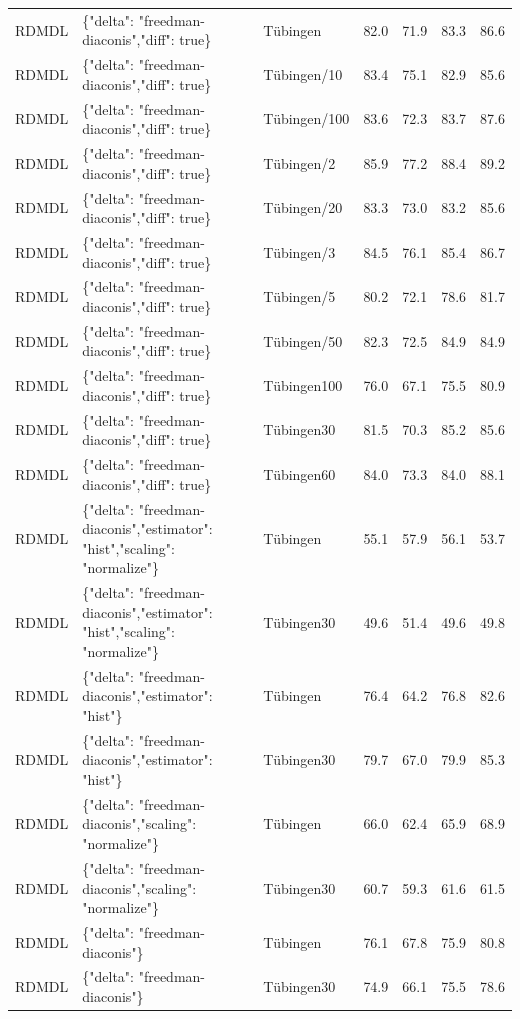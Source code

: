 \begin{tabular}{lllllll}
RDMDL & \{"delta": "freedman-diaconis","diff": true\} & Tübingen & 82.0 & 71.9 & 83.3 & 86.6 \\
RDMDL & \{"delta": "freedman-diaconis","diff": true\} & Tübingen/10 & 83.4 & 75.1 & 82.9 & 85.6 \\
RDMDL & \{"delta": "freedman-diaconis","diff": true\} & Tübingen/100 & 83.6 & 72.3 & 83.7 & 87.6 \\
RDMDL & \{"delta": "freedman-diaconis","diff": true\} & Tübingen/2 & 85.9 & 77.2 & 88.4 & 89.2 \\
RDMDL & \{"delta": "freedman-diaconis","diff": true\} & Tübingen/20 & 83.3 & 73.0 & 83.2 & 85.6 \\
RDMDL & \{"delta": "freedman-diaconis","diff": true\} & Tübingen/3 & 84.5 & 76.1 & 85.4 & 86.7 \\
RDMDL & \{"delta": "freedman-diaconis","diff": true\} & Tübingen/5 & 80.2 & 72.1 & 78.6 & 81.7 \\
RDMDL & \{"delta": "freedman-diaconis","diff": true\} & Tübingen/50 & 82.3 & 72.5 & 84.9 & 84.9 \\
RDMDL & \{"delta": "freedman-diaconis","diff": true\} & Tübingen100 & 76.0 & 67.1 & 75.5 & 80.9 \\
RDMDL & \{"delta": "freedman-diaconis","diff": true\} & Tübingen30 & 81.5 & 70.3 & 85.2 & 85.6 \\
RDMDL & \{"delta": "freedman-diaconis","diff": true\} & Tübingen60 & 84.0 & 73.3 & 84.0 & 88.1 \\
RDMDL & \{"delta": "freedman-diaconis","estimator": "hist","scaling": "normalize"\} & Tübingen & 55.1 & 57.9 & 56.1 & 53.7 \\
RDMDL & \{"delta": "freedman-diaconis","estimator": "hist","scaling": "normalize"\} & Tübingen30 & 49.6 & 51.4 & 49.6 & 49.8 \\
RDMDL & \{"delta": "freedman-diaconis","estimator": "hist"\} & Tübingen & 76.4 & 64.2 & 76.8 & 82.6 \\
RDMDL & \{"delta": "freedman-diaconis","estimator": "hist"\} & Tübingen30 & 79.7 & 67.0 & 79.9 & 85.3 \\
RDMDL & \{"delta": "freedman-diaconis","scaling": "normalize"\} & Tübingen & 66.0 & 62.4 & 65.9 & 68.9 \\
RDMDL & \{"delta": "freedman-diaconis","scaling": "normalize"\} & Tübingen30 & 60.7 & 59.3 & 61.6 & 61.5 \\
RDMDL & \{"delta": "freedman-diaconis"\} & Tübingen & 76.1 & 67.8 & 75.9 & 80.8 \\
RDMDL & \{"delta": "freedman-diaconis"\} & Tübingen30 & 74.9 & 66.1 & 75.5 & 78.6 \\

\end{tabular}
